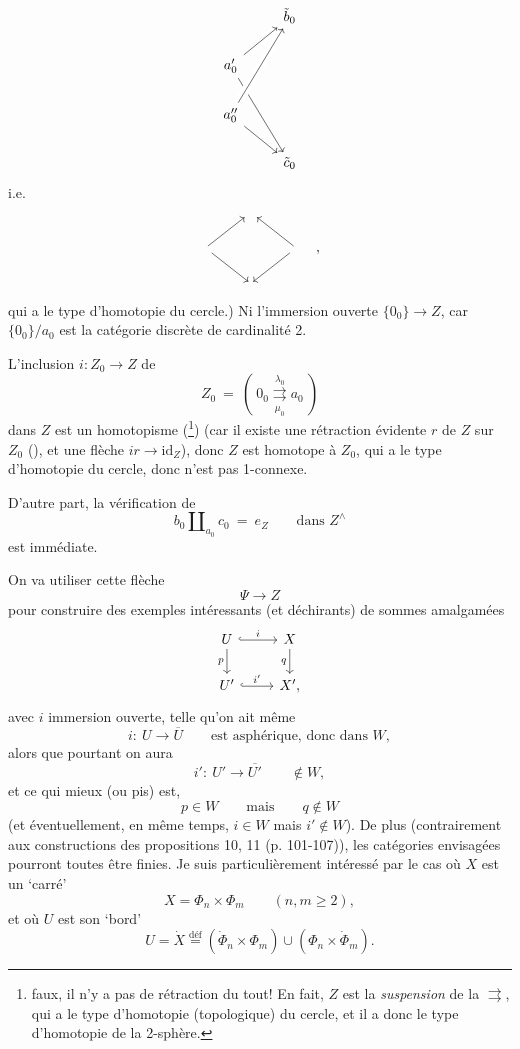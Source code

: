 \documentclass[11pt]{article}
\newcommand{\printedpage}[1]{\marginpar{\footnotesize p.~#1}}
\newcommand{\msp}[1]{\marginpar{\footnotesize [#1]}}
\newcommand{\id}{\mathrm{id}}
\begin{document}
\[
\begin{tikzcd}
& \tilde{b}_0 \\
a'_0 \arrow[ur] \arrow[ddr] & \\
a''_0 \arrow[uur, crossing over] \arrow[dr] & \\
& \tilde{c}_0
\end{tikzcd}
\]
\printedpage{8}
i.e.
\[
\begin{tikzcd}
& {} & \\
{} \arrow[ur] \arrow[dr] & & {} \arrow[ul] \arrow[dl] \\
& {} &
\end{tikzcd}
\quad ,
\]
qui a le type d'homotopie du cercle.) Ni l'immersion ouverte $\{0_0\} \longrightarrow Z$, car $\{0_0\}/a_0$ est la catégorie discrète de cardinalité 2.

L'inclusion $i : Z_0 \longrightarrow Z$ de
\[ Z_0 \ = \ (\ 0_0 \overset{\lambda_0}{\underset{\mu_0}{\rightrightarrows}} a_0\ ) \]
dans $Z$ est un homotopisme (\footnote[7]{faux, il n'y a pas de rétraction du tout! En fait, $Z$ est la \textit{suspension} de la $\rightrightarrows$, qui a le type d'homotopie (topologique) du cercle, et il a donc le type d'homotopie de la 2-sphère.}) (car il existe une rétraction évidente $r$ de $Z$ sur $Z_0$ (\footnotemark[7]), et une flèche $ir \longrightarrow \id_Z$), donc $Z$ est homotope à $Z_0$, qui a le type d'homotopie du cercle, donc n'est pas 1-connexe.

\msp{page 12}
D'autre part, la vérification de
\[ b_0 \amalg_{a_0} c_0 \ = \ e_Z \qquad \text{dans } Z^{\wedge} \]
est immédiate.

On va utiliser cette flèche
\[ \Psi \longrightarrow Z \]
pour construire des exemples intéressants (et déchirants) de sommes amalgamées
\[
\begin{tikzcd}
U \arrow[r, hook, "i"] \arrow[d, "p"'] & X \arrow[d, "q"'] \\
U' \arrow[r, hook, "i'"] & X',
\end{tikzcd}
\]
avec $i$ immersion ouverte, telle qu'on ait même
\[ i :\ U \longrightarrow \overline{U} \qquad \text{est asphérique, donc dans } W, \]
alors que pourtant on aura
\[ i' :\ U' \longrightarrow \overline{U'} \qquad \notin W, \]
et ce qui mieux (ou pis) est,
\[ p \in W \qquad \text{mais} \qquad q \notin W \]
\printedpage{9}
(et éventuellement, en même temps, $i \in W$ mais $i' \notin W$). De plus (contrairement aux constructions des propositions 10, 11 (p. 101-107)), les catégories envisagées pourront toutes être finies. Je suis particulièrement intéressé par le cas où $X$ est un ‘carré’
\[ X = \Phi_n \times \Phi_m \qquad (n,m \geq 2), \]
et où $U$ est son ‘bord’
\[ U = \dot{X} \overset{\text{déf}}{=} (\dot{\Phi}_n \times \Phi_m) \cup (\Phi_n \times \dot{\Phi}_m). \]
\end{document}
